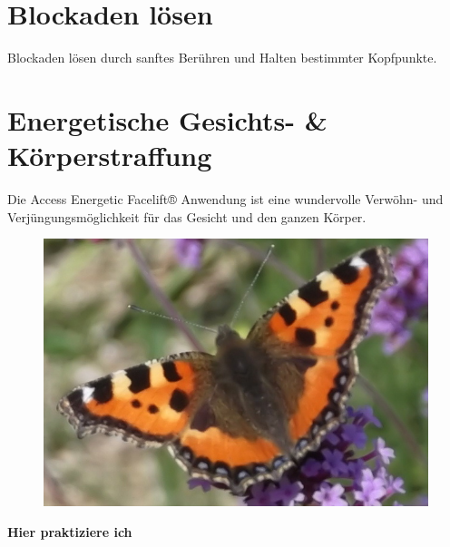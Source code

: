 \documentclass[10pt,foldmark,notumble]{leaflet}
\begin{document}
\newpage


\section{Blockaden lösen}
Blockaden lösen durch sanftes Berühren und Halten bestimmter Kopfpunkte. 

\section{Energetische Gesichts- \& Körperstraffung}
Die Access Energetic Facelift® Anwendung ist eine wundervolle Verwöhn- und Verjüngungsmöglichkeit für das Gesicht und den ganzen Körper.

\vspace*{20mm}
\begin{figure}[h] %
\begin{center}
\includegraphics [scale=.38]{Schmetterling3.JPG}
 \end{center}
\end{figure}


\newpage

\centerline {\LARGE {\bf {Hier praktiziere ich}}}
\end{document}
